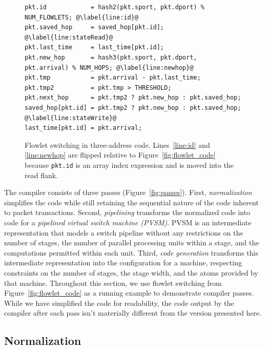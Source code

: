 \begin{figure}[!t]
\begin{minipage}{\textwidth}
\begin{lstlisting}[style=customc]
pkt.id            = hash2(pkt.sport, pkt.dport) % NUM_FLOWLETS; @\label{line:id}@
pkt.saved_hop     = saved_hop[pkt.id]; @\label{line:stateRead}@
pkt.last_time     = last_time[pkt.id];
pkt.new_hop       = hash3(pkt.sport, pkt.dport, pkt.arrival) % NUM_HOPS; @\label{line:newhop}@
pkt.tmp           = pkt.arrival - pkt.last_time;
pkt.tmp2          = pkt.tmp > THRESHOLD;
pkt.next_hop      = pkt.tmp2 ? pkt.new_hop : pkt.saved_hop;
saved_hop[pkt.id] = pkt.tmp2 ? pkt.new_hop : pkt.saved_hop; @\label{line:stateWrite}@
last_time[pkt.id] = pkt.arrival;
\end{lstlisting}
\caption[title2]{Flowlet switching in three-address
code. Lines~\ref{line:id} and \ref{line:newhop} are flipped relative
to Figure~\ref{fig:flowlet_code} because {\tt pkt.id} is an array index expression and is
moved into the read flank.}
\label{fig:three_address}
\end{minipage}
\vspace{-0.5cm}
\end{figure}

The \pktlanguage compiler consists of three passes (Figure~\ref{fig:passes}).
First, \textit{normalization} simplifies the code while still retaining the
sequential nature of the code inherent to packet transactions. Second,
\textit{pipelining} transforms the normalized code into code for a
\textit{pipelined virtual switch machine (PVSM)}. PVSM is an intermediate representation that
models a switch pipeline without any restrictions on the number of stages,
the number of parallel processing units within a stage, and the computations
permitted within each unit. Third, \textit{code generation} transforms this
intermediate representation into the configuration for a \absmachine machine,
respecting constraints on the number of stages, the stage width, and the atoms
provided by that machine. Throughout this section, we use flowlet switching from
Figure~\ref{fig:flowlet_code} as a running example to demonstrate compiler
passes.  While we have simplified the code for readability, the code output by
the \pktlanguage compiler after each pass isn't materially different from the
version presented here.

\subsection{Normalization}


